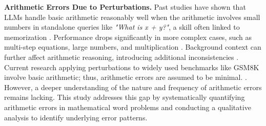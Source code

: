 




\noindent \textbf{Arithmetic Errors Due to Perturbations.} Past studies have shown that LLMs handle basic arithmetic reasonably well when the arithmetic involves small numbers in standalone queries like \textit{"What is x + y?"}, a skill often linked to memorization \cite{yang2023gpt, maltoni2024arithmetic, yuan2023well, qian2023-arithmeticerror, feng2024numerical}. Performance drops significantly in more complex cases, such as multi-step equations, large numbers, and multiplication \cite{kao2024solving, yuan2023well, yang2023gpt, feng2024numerical, qian2023-arithmeticerror}. Background context can further affect arithmetic reasoning, introducing additional inconsistencies \cite{abedin2025arithmattack}. 
Current research applying perturbations to widely used benchmarks like GSM8K involve basic arithmetic; thus, arithmetic errors are assumed to be minimal. \cite{mirzadeh2024-gsmsymbolic, xie2024llm, anand2024mathify}.  However, a deeper understanding of the nature and frequency of arithmetic errors remains lacking. This study addresses this gap by systematically quantifying arithmetic errors in mathematical word problems and conducting a qualitative analysis to identify underlying error patterns.